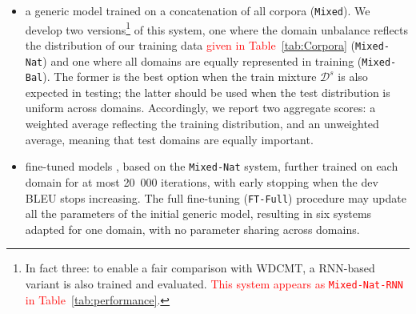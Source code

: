 \documentclass[11pt,a4paper]{article}
\newcommand{\jcDone}[1]{\done[JC]\Todo[JC:]{\textcolor{red}{#1}}}
\newcommand{\revision}[1]{\textcolor{red}{#1}}
\newcommand{\revisiondel}[1]{}
\newcommand{\system}[1]{\texttt{{#1}}}
\begin{document}
\begin{itemize}
\item a generic model trained on a concatenation of all corpora (\texttt{Mixed}). We develop two versions\footnote{In fact three: to enable a fair comparison with WDCMT, a RNN-based variant is also trained and evaluated. \revision{This system appears as \system{Mixed-Nat-RNN} in Table~\ref{tab:performance}}.} of this system, one where the domain unbalance reflects the distribution of our training data \revision{given in Table~\ref{tab:Corpora}} (\system{Mixed-Nat}) and one where all domains are equally represented in training (\system{Mixed-Bal}). The former is the best option when the train mixture $\mathcal{D}^s$ is also expected in testing; the latter should be used when the test distribution is uniform across domains. Accordingly, we report two aggregate scores: a weighted average reflecting the training distribution, and an unweighted average, meaning that test domains are equally important.
\item fine-tuned models \cite{Luong15stanford,Freitag16fast}\jcDone{i would use Luong and Manning 2015}, based on the \system{Mixed-Nat} system, further trained on each domain for at most 20~000 iterations, with early stopping when the dev BLEU stops increasing. The full fine-tuning (\system{FT-Full}) procedure may update all the parameters of the initial generic model, resulting in six systems adapted for one domain, with no parameter sharing across domains.
\revisiondel{We again contrast two versions: full fine-tuning (\system{FT-Full}), which may update all the parameters of the initial generic model; and the variant of \cite{Bapna19simple}, where fine-tuning only updates a small adaptation module that is added (with residual connections) on top of every Transformer layer (\system{FT Res}).}
\end{itemize}
\end{document}

